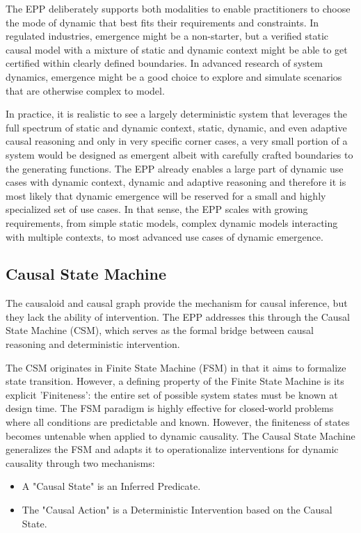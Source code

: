 The EPP deliberately supports both modalities to enable practitioners to choose the mode of dynamic that best fits their requirements and constraints. In regulated industries, emergence might be a non-starter, but a verified static causal model with a mixture of static and dynamic context might be able to get certified within clearly defined boundaries. In advanced research of system dynamics, emergence might be a good choice to explore and simulate scenarios that are otherwise complex to model. 

In practice, it is realistic to see a largely deterministic system that leverages the full spectrum of static and dynamic context, static, dynamic, and even adaptive causal reasoning and only in very specific corner cases, a very small portion of a system would be designed as emergent albeit with  carefully crafted boundaries to the generating functions. The EPP already enables a large part of dynamic use cases with dynamic context, dynamic and adaptive reasoning and therefore it is most likely that dynamic emergence will be reserved for a small and highly specialized set of use cases. In that sense, the EPP scales with growing requirements, from simple static models, complex dynamic models interacting with multiple contexts, to most advanced use cases of dynamic emergence. 


%
%
\subsection{Causal State Machine}
\label{sec:epp_csm}

The causaloid and causal graph provide the mechanism for causal inference, 
but they lack the ability of intervention. The EPP addresses this through the Causal State Machine (CSM), which serves as the formal bridge between causal reasoning and deterministic intervention.

The CSM originates in Finite State Machine (FSM) in that it aims to formalize state transition.
However, a defining property of the Finite State Machine is its explicit 'Finiteness': the entire set of possible system states must be known at design time. The FSM paradigm is highly effective for closed-world problems where all conditions are predictable and known. However, the finiteness of states becomes untenable when applied to dynamic causality. The Causal State Machine generalizes the FSM and adapts it 
to operationalize interventions for dynamic causality through two mechanisms:
 
\begin{itemize}
	\item A "Causal State" is an Inferred Predicate. 
	\item The "Causal Action" is a Deterministic Intervention based on the  Causal State.
\end{itemize}

